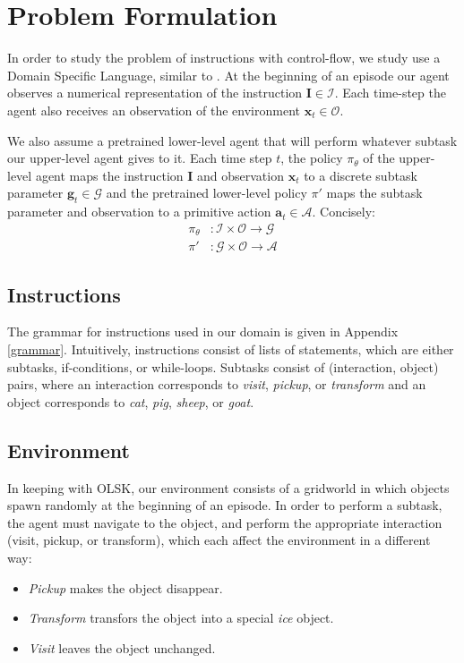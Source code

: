 \documentclass{article}
\begin{document}
\section{Problem Formulation}

In order to study the problem of instructions with control-flow, we
study use a Domain Specific Language, similar to \citet{sun2020program}.
At the beginning of an episode our agent observes a numerical representation of
the instruction $\mathbf{I} \in\mathcal{I}$. Each time-step the agent also receives an observation of the
environment $\mathbf{x}_t \in\mathcal{O}$. 

We also assume a pretrained lower-level agent that will perform whatever subtask our
upper-level agent gives to it. Each time step $t$, the policy $\pi_\theta$ of the upper-level agent
maps the instruction
$\mathbf{I}$ and
observation $\mathbf{x}_t$ to a discrete subtask parameter
$\mathbf{g}_t \in\mathcal{G}$ and the
pretrained lower-level policy $\pi'$ maps the subtask parameter and observation to
a primitive action $\mathbf{a}_t \in \mathcal{A}$. Concisely:
\begin{align}
  \pi_\theta&: \mathcal{I} \times \mathcal{O} \to \mathcal{G} \\
  \pi'&: \mathcal{G} \times \mathcal{O} \to \mathcal{A}
\end{align}

\subsection{Instructions}
The grammar for instructions used in our domain is given in Appendix
\ref{grammar}.
Intuitively, instructions consist of lists of statements, which are either subtasks,
if-conditions, or while-loops. Subtasks consist of (interaction, object) pairs,
where an interaction corresponds to \textit{visit}, \textit{pickup}, or
\textit{transform} and an object corresponds to \textit{cat}, \textit{pig},
\textit{sheep}, or \textit{goat}.

\subsection{Environment}
In keeping with OLSK, our environment consists of a gridworld in which
objects spawn randomly at the beginning of an episode. In order to perform a
subtask, the agent must navigate to the object, and perform the appropriate
interaction (visit, pickup, or transform), which each affect the environment in
a different way:
\begin{itemize}
  \item \textit{Pickup} makes the object disappear. 
  \item \textit{Transform} transfors the object into a special \textit{ice}
    object.
  \item \textit{Visit} leaves the object unchanged.
\end{itemize}
\end{document}
